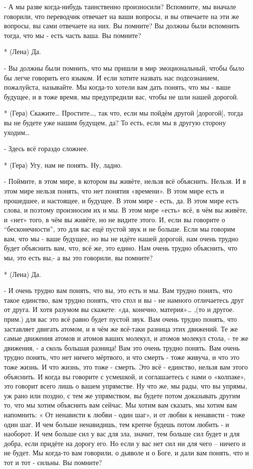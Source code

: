 - А мы разве когда-нибудь таинственно произносили? Вспомните, мы вначале говорили, что переводчик отвечает на ваши вопросы, и вы отвечаете на эти же вопросы, вы сами отвечаете на них. Вы помните? Вы должны были вспомнить тогда, что мы - есть часть ваша. Вы помните?

* (Лена) Да.

- Вы должны были помнить, что мы пришли в мир эмоциональный, чтобы было бы легче говорить его языком. И если хотите назвать нас подсознанием, пожалуйста, называйте. Мы когда-то хотели вам дать понять, что мы - ваше будущее, и в тоже время, мы предупредили вас, чтобы не шли нашей дорогой.

* (Гера) Скажите… Простите…, так что, если мы пойдём другой [дорогой], тогда вы не будете уже нашим будущем, да? То есть, если мы в другую сторону уходим…

- Здесь всё гораздо сложнее.

* (Гера) Угу, нам не понять. Ну, ладно.

- Поймите, в этом мире, в котором вы живёте, нельзя всё объяснить. Нельзя. И в этом мире нельзя понять, что нет понятия «времени». В этом мире есть и прошедшее, и настоящее, и будущее. В этом мире - есть, да. В этом мире есть слова, и поэтому произносим их и мы. В этом мире «есть» всё, в чём вы живёте, и «нет» того, в чём вы живёте, но не видите этого. И, если вы говорите о “бесконечности”, это для вас ещё пустой звук и не больше. Если мы говорим вам, что мы - ваше будущее, но вы не идёте нашей дорогой, нам очень трудно будет объяснить вам, что, всё же, это едино. Нам очень трудно объяснить, что мы, это есть вы,- а вы это говорили, вы помните?

* (Лена) Да.

- И очень трудно вам понять, что вы, это есть и мы. Вам трудно понять, что такое единство, вам трудно понять, что стол и вы - не намного отличаетесь друг от друга. И хотя разумом вы скажете: «да, конечно, материя»… ,(то и другое. прим.)  для вас это всё равно будет пустой звук. Вам очень трудно понять, что заставляет двигать атомом, и в чём же всё-таки разница этих движений. Те же самые движения  атомов и атомов ваших молекул, и атомов молекул стола, -  те же движения, - а сколь большая разница! Вам это очень трудно понять. Вам очень трудно понять, что нет ничего мёртвого, и что смерть - тоже живуча, и что это тоже жизнь. И что жизнь, это тоже - смерть. Это всё - единство, нельзя вам этого объяснить. И когда вы говорите с усмешкой, и соглашаетесь с нами о «колпаке», это говорит всего лишь о вашем упрямстве. Ну что же, мы рады, что вы упрямы, уж рано или поздно, с тем же упрямством, вы будете потом доказывать другим то, что мы хотим объяснить вам сейчас. Мы хотим вам сказать, мы хотим вам напомнить: « От ненависти к любви - один шаг», и от любви к ненависти - тоже один шаг. И чем больше ненавидишь, тем крепче будешь потом любить - и наоборот. И чем больше сил у вас для зла, значит, тем больше сил будет и для добра, если придёте на дорогу его. Но если у вас нет сил ни для чего – ничего и не будет. Мы когда-то вам говорили, о дьяволе и о Боге, и дали вам понять, что и тот и тот - сильны. Вы помните?

